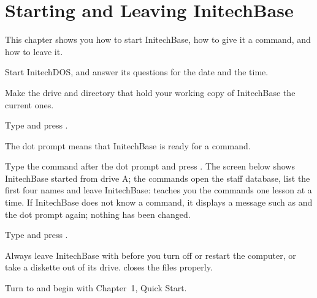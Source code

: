 \chapter{Starting and Leaving InitechBase}
This chapter shows you how to start InitechBase, how to give it a command, and
how to leave it.

\begin{Steps}
\item Start InitechDOS, and answer its questions for the date and the time.
\item Make the drive and directory that hold your working copy of InitechBase
  the current ones.
\item Type  and press .
\end{Steps}
The dot prompt means that InitechBase is ready for a command.

Type the command after the dot prompt and press .  The screen below
shows InitechBase started from drive A; the commands open the staff database,
list the first four names and leave InitechBase:
 teaches you the commands one lesson at a time.
If InitechBase does not know a command, it displays a message such as
 and the dot prompt again; nothing
has been changed.

\begin{Steps}[resume]
\item Type  and press .
\end{Steps}
\begin{AteWarning}
Always leave InitechBase with  before you turn off or restart the
computer, or take a diskette out of its drive.   closes the files
properly.
\end{AteWarning}

Turn to  and begin with Chapter~1, Quick Start.
